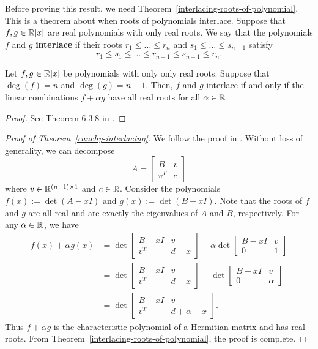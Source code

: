 \documentclass{puthesis-UG}
\begin{document}
Before proving this result, we need Theorem~\ref{interlacing-roots-of-polynomial}. This is a theorem about when roots of polynomials interlace. Suppose that $f, g \in \mathbb{R}[x]$ are real polynomials with only real roots. We say that the polynomials $f$ and $g$ \textbf{interlace} if their roots $r_1 \leq \ldots \leq r_n$ and $s_1 \leq \ldots \leq s_{n-1}$ satisfy
\[
	r_1 \leq s_1 \leq \ldots \leq r_{n-1} \leq s_{n-1} \leq r_n.
\]

\begin{thm} \label{interlacing-roots-of-polynomial}
	Let $f, g \in \mathbb{R}[x]$ be polynomials with only only real roots. Suppose that $\deg (f) = n$ and $\deg (g) = n-1$. Then, $f$ and $g$ interlace if and only if the linear combinations $f + \alpha g$ have all real roots for all $\alpha \in \mathbb{R}$. 
\end{thm} 
\begin{proof}
	See Theorem 6.3.8 in \cite{rahman}.
\end{proof}

\begin{proof}[Proof of Theorem~\ref{cauchy-interlacing}]
	We follow the proof in \cite{fisk}. Without loss of generality, we can decompose 
	\[
		A = \begin{bmatrix}
			B & v \\
			v^T & c
		\end{bmatrix}
	\]
	where $v \in \mathbb{R}^{(n-1) \times 1}$ and $c \in \mathbb{R}$. Consider the polynomials $f(x) := \det (A - xI)$ and $g(x) := \det (B - xI)$. Note that the roots of $f$ and $g$ are all real and are exactly the eigenvalues of $A$ and $B$, respectively. For any $\alpha \in \mathbb{R}$, we have
	\begin{align*}
		f(x) + \alpha g(x) & = \det\begin{bmatrix}
			B-xI & v \\
			v^T & d-x
		\end{bmatrix} + \alpha \det \begin{bmatrix}
			B-xI & v \\
			0 & 1
		\end{bmatrix} \\
		& = \det\begin{bmatrix}
			B-xI & v \\
			v^T & d-x
		\end{bmatrix} + \det \begin{bmatrix}
			B-xI & v \\
			0 & \alpha
		\end{bmatrix} \\
		& = \det \begin{bmatrix}
			B-xI & v \\
			v^T & d+\alpha - x
		\end{bmatrix}.
	\end{align*}
	Thus $f + \alpha g$ is the characteristic polynomial of a Hermitian matrix and has real roots. From Theorem~\ref{interlacing-roots-of-polynomial}, the proof is complete. 
\end{proof}
\end{document}
